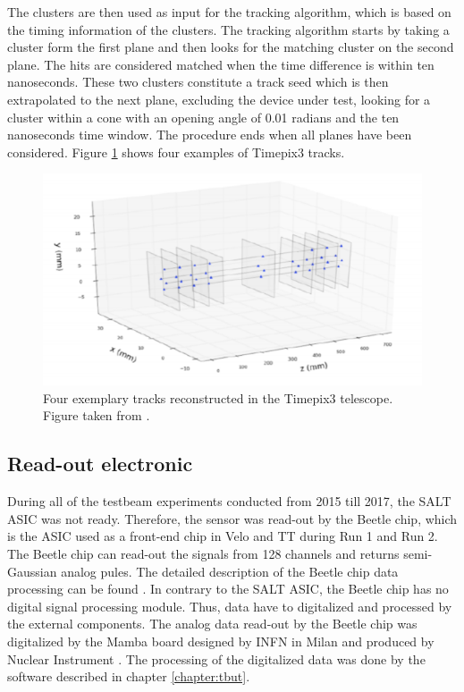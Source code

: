 The clusters are then used as input for the tracking algorithm, which is based on the timing information of the clusters.  The tracking algorithm starts by taking a cluster form the first plane and then looks for the matching cluster on the second plane. The hits are considered matched when the time difference is within ten nanoseconds. These two clusters constitute a track seed which is then extrapolated to the next plane, excluding the device under test, looking for a cluster within a cone with an opening angle of 0.01 radians and the ten nanoseconds time window. The procedure ends when all planes have been considered. Figure \ref{fig:telescope_tracks} shows four examples of Timepix3 tracks. 



\begin{figure}
\centering
\includegraphics[scale=0.9]{figures/telescope_tracks.png}
\caption{Four exemplary tracks reconstructed in the Timepix3 telescope. Figure taken from \cite{Sophie}.}
\label{fig:telescope_tracks}
\end{figure}


\subsection{Read-out electronic}
During all of the testbeam experiments conducted from 2015 till 2017, the SALT ASIC was not ready. Therefore, the sensor was read-out by the Beetle chip, which is the ASIC used as a front-end chip in Velo and TT during Run 1 and Run 2. The Beetle chip can read-out the signals from 128 channels and returns semi-Gaussian analog pules. The detailed description of the Beetle chip data processing can be found \cite{Beetle}. In contrary to the SALT ASIC, the Beetle chip has no digital signal processing module. Thus, data have to digitalized and processed by the external components.  
The analog data read-out by the Beetle chip was digitalized by the Mamba board designed by INFN in Milan and produced by Nuclear Instrument \cite{NuclearInstruments}.   
The processing of the digitalized data was done by the software described in chapter \ref{chapter:tbut}. 

